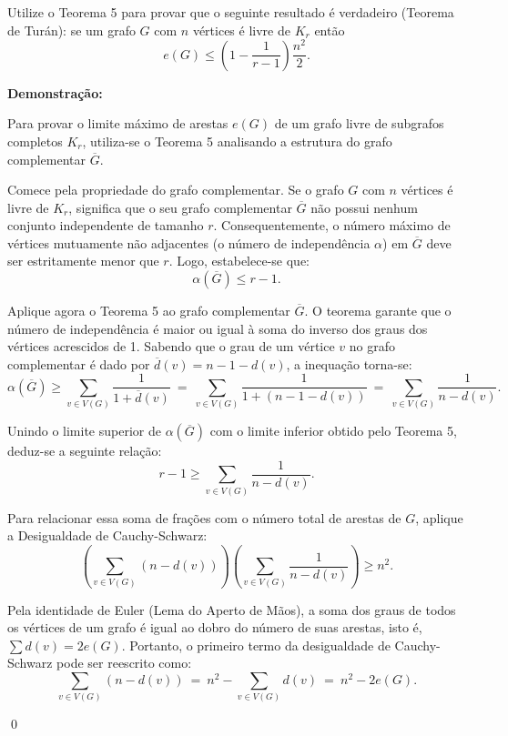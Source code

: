 \documentclass[12pt]{article}
\newenvironment{problem}[2][Exercício]{\begin{trivlist}
\item[\hskip \labelsep {\bfseries #1}\hskip \labelsep {\bfseries #2.}]}{\end{trivlist}}
\newenvironment{sol}
    {\textbf{Demonstração:}\emph{}
    }
    {
    \qed
    }
\begin{document}
\begin{problem}{13}
    Utilize o Teorema 5 para provar que o seguinte resultado é verdadeiro (Teorema de Turán): se um grafo $G$ com $n$ vértices é livre de $K_r$ então
    \[
        e(G) \le \left( 1 - \frac{1}{r-1} \right) \frac{n^2}{2}.
    \]
\end{problem}
\begin{sol}
    Para provar o limite máximo de arestas $e(G)$ de um grafo livre de subgrafos completos $K_r$, utiliza-se o Teorema 5 analisando a estrutura do grafo complementar $\overline{G}$.
    
    Comece pela propriedade do grafo complementar. Se o grafo $G$ com $n$ vértices é livre de $K_r$, significa que o seu grafo complementar $\overline{G}$ não possui nenhum conjunto independente de tamanho $r$. Consequentemente, o número máximo de vértices mutuamente não adjacentes (o número de independência $\alpha$) em $\overline{G}$ deve ser estritamente menor que $r$. Logo, estabelece-se que:
    \[
        \alpha(\overline{G}) \le r - 1.
    \]
    
    Aplique agora o Teorema 5 ao grafo complementar $\overline{G}$. O teorema garante que o número de independência é maior ou igual à soma do inverso dos graus dos vértices acrescidos de 1. Sabendo que o grau de um vértice $v$ no grafo complementar é dado por $\overline{d}(v) = n - 1 - d(v)$, a inequação torna-se:
    \[
        \alpha(\overline{G}) \ge \sum_{v \in V(G)} \frac{1}{1 + \overline{d}(v)} \ = \ \sum_{v \in V(G)} \frac{1}{1 + (n - 1 - d(v))} \ = \ \sum_{v \in V(G)} \frac{1}{n - d(v)}.
    \]
    
    Unindo o limite superior de $\alpha(\overline{G})$ com o limite inferior obtido pelo Teorema 5, deduz-se a seguinte relação:
    \[
        r - 1 \ge \sum_{v \in V(G)} \frac{1}{n - d(v)}.
    \]
    
    Para relacionar essa soma de frações com o número total de arestas de $G$, aplique a Desigualdade de Cauchy-Schwarz:
    \[
        \left( \sum_{v \in V(G)} (n - d(v)) \right) \left( \sum_{v \in V(G)} \frac{1}{n - d(v)} \right) \ge n^2.
    \]
    
    Pela identidade de Euler (Lema do Aperto de Mãos), a soma dos graus de todos os vértices de um grafo é igual ao dobro do número de suas arestas, isto é, $\sum d(v) = 2e(G)$. Portanto, o primeiro termo da desigualdade de Cauchy-Schwarz pode ser reescrito como:
    \[
        \sum_{v \in V(G)} (n - d(v)) \ = \ n^2 - \sum_{v \in V(G)} d(v) \ = \ n^2 - 2e(G).
    \]
    

\end{sol}
\end{document}

